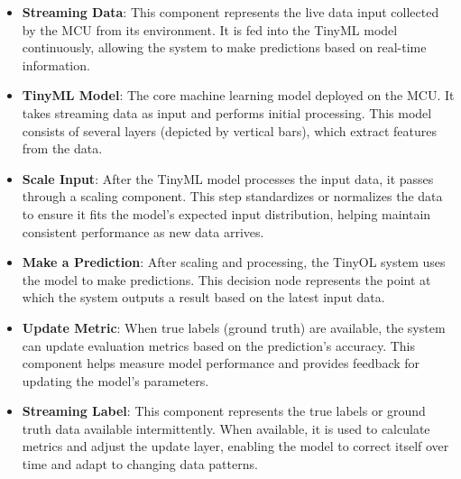 \documentclass[twocolumn]{article}
\begin{document}
\begin{itemize}
    \item \textbf{Streaming Data}:
    This component represents the live data input collected by the MCU from its environment. It is fed into the TinyML model continuously, allowing the system to make predictions based on real-time information.

    \item \textbf{TinyML Model}:
    The core machine learning model deployed on the MCU. It takes streaming data as input and performs initial processing. This model consists of several layers (depicted by vertical bars), which extract features from the data.

    \item \textbf{Scale Input}:
    After the TinyML model processes the input data, it passes through a scaling component. This step standardizes or normalizes the data to ensure it fits the model’s expected input distribution, helping maintain consistent performance as new data arrives.

    \item \textbf{Make a Prediction}:
    After scaling and processing, the TinyOL system uses the model to make predictions. This decision node represents the point at which the system outputs a result based on the latest input data.

    \item \textbf{Update Metric}:
    When true labels (ground truth) are available, the system can update evaluation metrics based on the prediction’s accuracy. This component helps measure model performance and provides feedback for updating the model’s parameters.

    \item \textbf{Streaming Label}:
    This component represents the true labels or ground truth data available intermittently. When available, it is used to calculate metrics and adjust the update layer, enabling the model to correct itself over time and adapt to changing data patterns.
\end{itemize}
\end{document}
